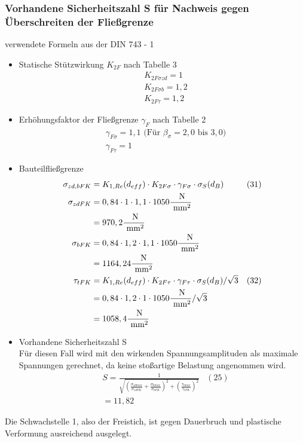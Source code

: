 \subsubsection{Vorhandene Sicherheitszahl S für Nachweis gegen Überschreiten der Fließgrenze}
verwendete Formeln aus der DIN 743 - 1
\begin{itemize}
\item Statische Stützwirkung $K_{2F}$ nach Tabelle 3
	\begin{align*}
	&K_{2F \sigma zd} = 1 \\
	&K_{2F \sigma b} = 1,2 \\
	&K_{2F \tau} = 1,2 
	\end{align*}
\item Erhöhungsfaktor der Fließgrenze $\gamma_{F}$ nach Tabelle 2
	\begin{align*}
	&\gamma_{F\sigma} = 1,1 \text{ (Für } \beta_{\sigma} = 2,0 \text{ bis } 3,0 \text{)} \\
	&\gamma_{F\tau} = 1 
	\end{align*}
\item Bauteilfließgrenze
	\begin{align*}
	\sigma_{zd,bFK} &= K_{1,Re} (d_{eff}) \cdot K_{2F \sigma} \cdot \gamma_{F\sigma} \cdot \sigma_S (d_B) & (31) \\
	\sigma_{zdFK}&= 0,84 \cdot 1 \cdot 1,1 \cdot 1050 \frac{\text{ N}}{\text{ mm}^2} \\
	&= 970,2 \frac{\text{ N}}{\text{ mm}^2}\\
	\sigma_{bFK}&= 0,84 \cdot 1,2 \cdot 1,1 \cdot 1050 \frac{\text{ N}}{\text{ mm}^2} \\
	&= 1164,24\frac{\text{ N}}{\text{ mm}^2}\\
	\tau_{tFK} &= K_{1,Re} (d_{eff}) \cdot K_{2F \tau} \cdot \gamma_{F\tau} \cdot \sigma_S (d_B) / \sqrt{3} &(32) \\
	&= 0,84 \cdot 1,2 \cdot 1 \cdot 1050 \frac{\text{ N}}{\text{ mm}^2} / \sqrt{3}\\
	&= 1058,4 \frac{\text{ N}}{\text{ mm}^2}
	\end{align*}
\item Vorhandene Sicherheitszahl S \\
	Für diesen Fall wird mit den wirkenden Spannungsamplituden als maximale Spannungen gerechnet, da keine stoßartige Belastung angenommen wird. 
	\begin{align*}
	&S = \frac{1}{\sqrt{\left( \frac{\sigma_{zdmax}}{\sigma_{zdFK}}+\frac{\sigma_{bmax}}{\sigma_{bFK}} \right)^2 +\left( \frac{\tau_{tmax}}{\tau_{tFK}} \right)^2 }} & (25)\\
	&= 11,82
	\end{align*}
\end{itemize}
Die Schwachstelle 1, also der Freistich, ist gegen Dauerbruch und plastische Verformung ausreichend ausgelegt.


